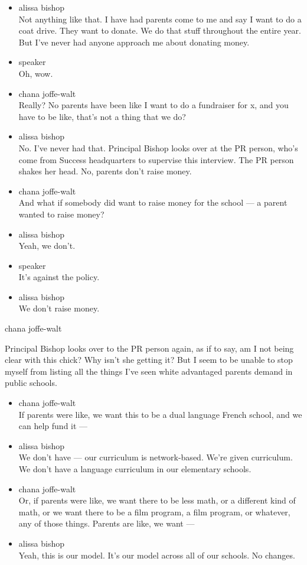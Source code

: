 \begin{itemize}
\item
  alissa bishop\\
  Not anything like that. I have had parents come to me and say I want
  to do a coat drive. They want to donate. We do that stuff throughout
  the entire year. But I've never had anyone approach me about donating
  money.
\item
  speaker\\
  Oh, wow.
\item
  chana joffe-walt\\
  Really? No parents have been like I want to do a fundraiser for x, and
  you have to be like, that's not a thing that we do?
\item
  alissa bishop\\
  No. I've never had that. Principal Bishop looks over at the PR person,
  who's come from Success headquarters to supervise this interview. The
  PR person shakes her head. No, parents don't raise money.
\item
  chana joffe-walt\\
  And what if somebody did want to raise money for the school --- a
  parent wanted to raise money?
\item
  alissa bishop\\
  Yeah, we don't.
\item
  speaker\\
  It's against the policy.
\item
  alissa bishop\\
  We don't raise money.
\end{itemize}

chana joffe-walt

Principal Bishop looks over to the PR person again, as if to say, am I
not being clear with this chick? Why isn't she getting it? But I seem to
be unable to stop myself from listing all the things I've seen white
advantaged parents demand in public schools.

\begin{itemize}
\item
  chana joffe-walt\\
  If parents were like, we want this to be a dual language French
  school, and we can help fund it ---
\item
  alissa bishop\\
  We don't have --- our curriculum is network-based. We're given
  curriculum. We don't have a language curriculum in our elementary
  schools.
\item
  chana joffe-walt\\
  Or, if parents were like, we want there to be less math, or a
  different kind of math, or we want there to be a film program, a film
  program, or whatever, any of those things. Parents are like, we want
  ---
\item
  alissa bishop\\
  Yeah, this is our model. It's our model across all of our schools. No
  changes.
\end{itemize}

